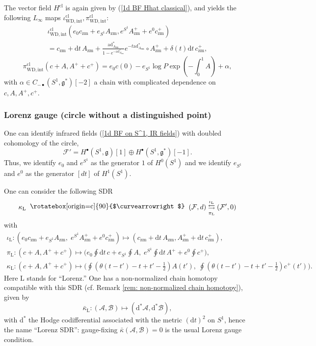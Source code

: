 \documentclass{amsart}
\theoremstyle{plain} %
\theoremstyle{definition}
\theoremstyle{remark}
\newcommand{\g}{\mathfrak{g}}
\newcommand{\mr}{\mathrm}
\newcommand{\bt}{\bullet}
\newcommand{\ad}{\mathrm{ad}}
\newcommand{\F}{\mathcal{F}}
\newcommand{\ii}{\mathrm{int}}
\newcommand{\SDR}[5]{#5\;\;\raisebox{1.3pt}{\rotatebox[origin=c]{90}{$\curvearrowright$}}\;\; #1 \underset{#4}{\stackrel{#3}{\leftrightarrows}} #2}  %
\newcommand{\cl}{\mathrm{cl}}
\newcommand{\A}{\mathcal{A}}
\newcommand{\B}{\mathcal{B}}
\newcommand{\zm}{\mathrm{zm}}
\newcommand{\dr}{\mathrm{d}}
\begin{document}
The vector field $H^\cl$ is again given by (\ref{1d BF Hhat classical}), and yields the following $L_\infty$ maps $\iota_{\mr{WD},\ii}^\cl,\pi_{\mr{WD},\ii}^\cl$:
\begin{multline}
    \iota_{\mr{WD},\ii}^\cl(e_0 c_\zm+e_{S^1}A_\zm, e^{S^1} A^+_\zm+ e^0 c^+_\zm)
    \\=
    c_\zm+\dr t\, A_\zm + \frac{\ad^*_{A_\zm}}{1-e^{-\ad^*_{A_\zm}}}e^{-t \ad^*_{A_\zm}}\circ A^+_\zm + \delta(t)\dr t\, c^+_\zm,
\end{multline}
\begin{equation}
    \pi_{\mr{WD},\ii}^\cl(c+A,A^++c^+)=e_0 c(0)-e_{S^1} \log P\exp \left(-\int_0^1 A\right) + \alpha,
\end{equation}
with $\alpha\in C_{-\bt}(S^1,\g^*)[-2]$ a chain with complicated dependence on $c,A,A^+,c^+$.



\subsubsection{Lorenz gauge (circle without a distinguished point)}
\label{sss 1d BF on S^1 Lorenz gauge}
One can identify infrared fields (\ref{1d BF on S^1, IR fields}) with doubled cohomology of the circle,
\begin{equation}\label{1d BF on S^1 IR fields as doubled cohomology}
    \F'=H^\bt(S^1,\g)[1]\oplus H^\bt(S^1,\g^*)[-1].
\end{equation}
Thus, we identify $e_0$ and $e^{S^1}$ as the generator $1$ of $H^0(S^1)$ and we identify $e_{S^1}$ and $e^0$ as the generator $[dt]$ of $H^1(S^1)$.

One can consider the following SDR
\begin{equation}
    \SDR{(\F,d)}{(\F',0)}{\iota_\mr{L}}{\pi_\mr{L}}{\kappa_\mr{L}}
\end{equation}
with
\begin{multline}
    \iota_\mr{L}\colon (e_0 c_\zm+e_{S^1} A_\zm,\; e^{S^1} A^+_\zm+e^0 c^+_\zm) \mapsto (c_\zm+\dr t\, A_\zm, A^+_\zm+\dr t\, c^+_\zm),\\
    \pi_\mr{L}\colon (c+A,A^++c^+)\mapsto \Big( e_0 \oint \dr t\, c + e_{S^1} \oint A,\; e^{S^1}\oint \dr t\, A^+ + e^0 \oint c^+\Big),\\
    \kappa_\mr{L} \colon (c+A,A^++c^+)\mapsto \Big(\oint (\theta(t-t')-t+t'-\frac12)A(t'),\; \oint (\theta(t-t')-t+t'-\frac12)c^+(t') \Big).
\end{multline}
Here $\mr{L}$ stands for ``Lorenz.'' One has a non-normalized chain homotopy compatible with this SDR (cf. Remark \ref{rem: non-normalized chain homotopy}), given by
\begin{equation}\label{1d BF on S^1 barkappa}
    \bar\kappa_\mr{L}\colon (\A,\B) \mapsto (\dr^* \A, \dr^* \B),
\end{equation}
with $\dr^*$ the Hodge codifferential associated with the metric $(\dr t)^2$ on $S^1$, hence the name ``Lorenz SDR'': gauge-fixing $\bar\kappa(\A,\B)=0$ is the usual Lorenz gauge condition.
\end{document}
